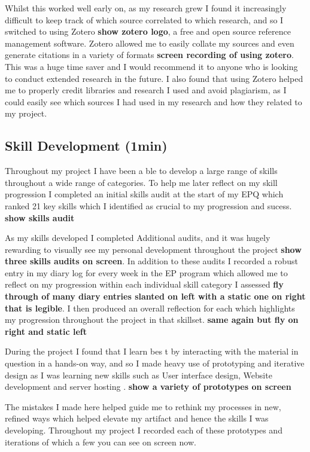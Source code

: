 Whilst this worked well early on, as my research grew I found it increasingly difficult to keep track of which source correlated to which research, and so I switched to using Zotero \textbf{show zotero logo}, a free and open source reference management software. Zotero allowed me to easily collate my sources and even generate citations in a variety of formats \textbf{screen recording of using zotero}. This was a huge time saver and I would recommend it to anyone who is looking to conduct extended research in the future. I also found that using Zotero helped me to properly credit libraries and research I used and avoid plagiarism, as I could easily see which sources I had used in my research and how they related to my project.

\subsection*{Skill Development (1min)}
Throughout my project I have been a  ble to develop a large range of skills throughout a wide range of categories. To help me later reflect on my skill progression I completed an initial skills audit at the start of my EPQ which ranked 21 key skills which I identified as crucial to my progression and sucess. \textbf{show skills audit}

As my skills developed I completed Additional audits, and it was hugely rewarding to visually see my personal development throughout the project \textbf{show three skills audits on screen}. In addition to these audits I recorded a robust entry in my diary log for every week in the EP program which allowed me to reflect on my progression within each individual skill category I assessed \textbf{fly through of many diary entries slanted on left with a static one on right that is legible}. I then produced an overall reflection for each which highlights my progression throughout the project in that skillset. \textbf{same again but fly on right and static left}

During the project I found that I learn bes t by interacting with the material in question in a hands-on way, and so I made heavy use of prototyping and iterative design as I was learning new skills such as User interface design, Website development and server hosting . \textbf{show a variety of prototypes on screen}

The mistakes I made here helped guide me to rethink my processes in new, refined ways which helped elevate my artifact and hence the skills I was developing. Throughout my project I recorded each of these prototypes and iterations of which a few you can see on screen now.

